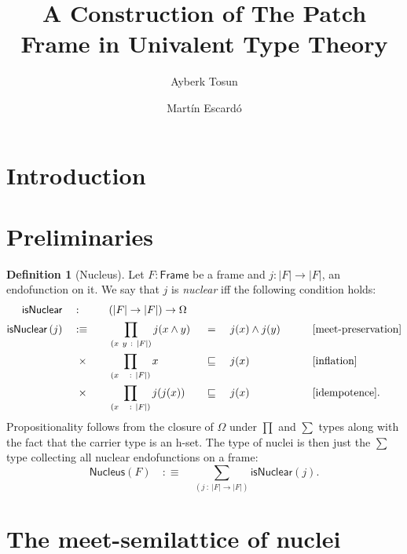 \documentclass[11pt,a4paper]{article}
\title{A Construction of The Patch Frame in Univalent Type Theory}
\author{Ayberk Tosun \and Mart\'{i}n Escard\'{o}}
\theoremstyle{definition}
\newtheorem{defn}{Definition}
\newcommand{\is}{:\equiv}
\newcommand{\framenm}{\mathsf{Frame}}
\newcommand{\isnuclearnm}{\mathsf{isNuclear}}
\newcommand{\isnuclear}[1]{\isnuclearnm{}\left(#1\right)}
\newcommand{\nucleus}{\mathsf{Nucleus}}
\newcommand{\abs}[1]{\left| #1 \right|}
\newcommand{\hprop}{\Omega}
\newcommand{\meet}[2]{#1 \wedge #2}
\newcommand{\pity}[3]{\prod_{(#1~:~#2)} #3}
\newcommand{\sigmaty}[3]{\sum_{(#1~:~#2)} #3}
\begin{document}
\maketitle

\begin{abstract}
\end{abstract}

\section{Introduction}


\section{Preliminaries}

\begin{defn}[Nucleus]\label{defn:nucleus}
  Let $F : \framenm{}$ be a frame and $j : \abs{F} \rightarrow \abs{F}$, an endofunction
  on it. We say that $j$ is \emph{nuclear} iff the following condition holds:
  \begin{alignat*}{5}
    \isnuclearnm{}\quad&:\quad &&(\abs{F} \rightarrow \abs{F}) \rightarrow \hprop{} && && &&              \\
    \isnuclear{j} \quad&\is\quad
       &&\pity{x~y}{\abs{F}}{j(\meet{x}{y}) &&~=~ &&\meet{j(x)}{j(y)}}   &&\qquad[\text{meet-preservation}]\\
      &\hspace{0.5em}\times\quad &&\pity{x~~}{\abs{F}}{x &&~\sqsubseteq~ &&j(x)}            &&\qquad[\text{inflation}]  \\
      &\hspace{0.5em}\times\quad &&\pity{x~~}{\abs{F}}{j(j(x)) &&~\sqsubseteq~ &&j(x)}      &&\qquad[\text{idempotence}].
  \end{alignat*}
  Propositionality follows from the closure of $\Omega$ under $\prod$ and $\sum$ types along
  with the fact that the carrier type is an h-set. The type of nuclei is then
  just the $\sum$ type collecting all nuclear endofunctions on a frame:
  \begin{equation*}
    \nucleus{}(F) \quad\is\quad \sigmaty{j}{\abs{F} \rightarrow \abs{F}}{\isnuclear{j}}.
  \end{equation*}
\end{defn}

\section{The meet-semilattice of nuclei}
\end{document}
